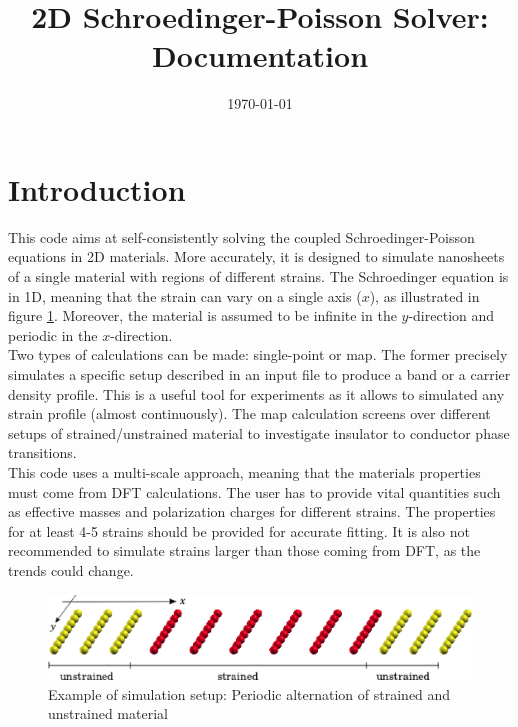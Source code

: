 \documentclass[a4paper,12pt]{article}
\begin{document}
\title{\textbf{\Huge { 2D Schroedinger-Poisson Solver: Documentation}}}
\date{\today}
\maketitle

\section{Introduction}

This code aims at self-consistently solving the coupled Schroedinger-Poisson equations in 2D materials. More accurately, it is designed to simulate nanosheets of a single material with regions of different strains. The Schroedinger equation is in 1D, meaning that the strain can vary on a single axis ($x$), as illustrated in figure \ref{fig:example1}. Moreover, the material is assumed to be infinite in the $y$-direction and periodic in the $x$-direction.\\

Two types of calculations can be made: single-point or map. The former precisely simulates a specific setup described in an input file to produce a band or a carrier density profile. This is a useful tool for experiments as it allows to simulated any strain profile (almost continuously). The map calculation screens over different setups of strained/unstrained material to investigate insulator to conductor phase transitions.\\

This code uses a multi-scale approach, meaning that the materials properties must come from DFT calculations. The user has to provide vital quantities such as effective masses and polarization charges  for different strains. The properties for at least 4-5 strains should be provided for accurate fitting. It is also not recommended to simulate strains larger than those coming from DFT, as the trends could change.

\begin{figure} 
\begin{center}
\captionsetup{width=0.8\textwidth}
\centerline{\includegraphics[width=12cm,angle=0]{example1.eps}}
\caption{Example of simulation setup: Periodic alternation of strained and unstrained material}
\label{fig:example1} 
\end{center}
\end{figure}
\end{document}
